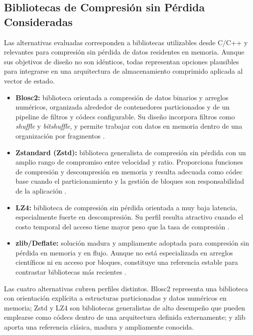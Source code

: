 \subsection{Bibliotecas de Compresión sin Pérdida Consideradas}

Las alternativas evaluadas corresponden a bibliotecas utilizables desde C/C++ y
relevantes para compresión sin pérdida de datos residentes en memoria. Aunque sus
objetivos de diseño no son idénticos, todas representan opciones plausibles para
integrarse en una arquitectura de almacenamiento comprimido aplicada al vector de
estado.

\begin{itemize}
    \item \textbf{Blosc2:} biblioteca orientada a compresión de datos binarios y arreglos
    numéricos, organizada alrededor de contenedores particionados y de un pipeline de
    filtros y códecs configurable. Su diseño incorpora filtros como \emph{shuffle} y
    \emph{bitshuffle}, y permite trabajar con datos en memoria dentro de una
    organización por fragmentos \parencite{blosc2_docs}.

    \item \textbf{Zstandard (Zstd):} biblioteca generalista de compresión sin pérdida con
    un amplio rango de compromiso entre velocidad y ratio. Proporciona funciones de
    compresión y descompresión en memoria y resulta adecuada como códec base cuando
    el particionamiento y la gestión de bloques son responsabilidad de la aplicación
    \parencite{ZstdRepo, ZstdSite}.

    \item \textbf{LZ4:} biblioteca de compresión sin pérdida orientada a muy baja latencia,
    especialmente fuerte en descompresión. Su perfil resulta atractivo cuando el
    costo temporal del acceso tiene mayor peso que la tasa de compresión
    \parencite{LZ4Repo}.

    \item \textbf{zlib/Deflate:} solución madura y ampliamente adoptada para compresión
    sin pérdida en memoria y en flujo. Aunque no está especializada en arreglos
    científicos ni en acceso por bloques, constituye una referencia estable para
    contrastar bibliotecas más recientes \parencite{ZlibTechDetails}.
\end{itemize}

Las cuatro alternativas cubren perfiles distintos. Blosc2 representa una biblioteca con
orientación explícita a estructuras particionadas y datos numéricos en memoria; Zstd y
LZ4 son bibliotecas generalistas de alto desempeño que pueden emplearse como códecs
dentro de una arquitectura definida externamente; y zlib aporta una referencia clásica,
madura y ampliamente conocida.
